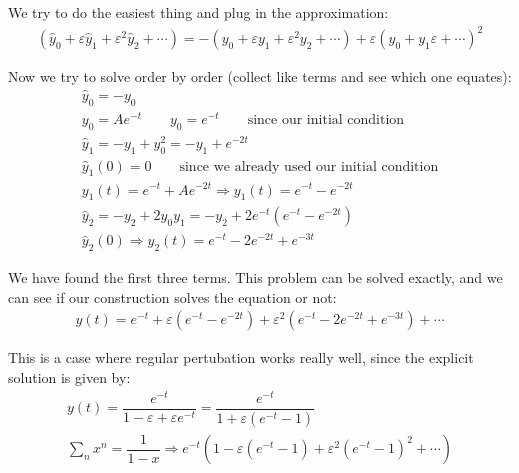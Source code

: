 \par\bigskip
\noindent We try to do the easiest thing and plug in the approximation:
\begin{equation*}
  \begin{gathered}
    (\hat{y}_0+\varepsilon\hat{y}_1+\varepsilon^2\hat{y}_2+\cdots) = -(y_0+\varepsilon y_1+\varepsilon^2 y_2+\cdots)+\varepsilon(y_0+y_1\varepsilon+\cdots)^2
  \end{gathered}
\end{equation*}\par
\noindent Now we try to solve order by order (collect like terms and see which one equates):
\begin{equation*}
  \begin{gathered}
    \hat{y}_0 = -y_0\\
    y_0 = Ae^{-t}\qquad y_0 = e^{-t}\qquad\text{since our initial condition}\\
    \hat{y}_1 = -y_1+y_0^2=-y_1+e^{-2t}\\
    \hat{y}_1(0) = 0\qquad\text{since we already used our initial condition}\\
    y_1(t) = e^{-t}+Ae^{-2t}\Rightarrow y_1(t) = e^{-t}-e^{-2t}\\
    \hat{y}_2 = -y_2+2y_0y_1=-y_2+2e^{-t}(e^{-t}-e^{-2t})\\
    \hat{y}_2(0)\Rightarrow y_2(t) = e^{-t}-2e^{-2t}+e^{-3t}
  \end{gathered}
\end{equation*}\par
\noindent We have found the first three terms. This problem can be solved exactly, and we can see if our construction solves the equation or not:
\begin{equation*}
  \begin{gathered}
    y(t) = e^{-t}+\varepsilon(e^{-t}-e^{-2t})+\varepsilon^2(e^{-t}-2e^{-2t}+e^{-3t})+\cdots
  \end{gathered}
\end{equation*}\par
\noindent This is a case where regular pertubation works really well, since the explicit solution is given by:
\begin{equation*}
  \begin{gathered}
    y(t) = \dfrac{e^{-t}}{1-\varepsilon+\varepsilon e^{-t}} = \dfrac{e^{-t}}{1+\varepsilon(e^{-t}-1)}\\
    \sum_{n}x^n = \dfrac{1}{1-x}\Rightarrow e^{-t}(1-\varepsilon(e^{-t}-1)+\varepsilon^2(e^{-t}-1)^2+\cdots)
  \end{gathered}
\end{equation*}\par
